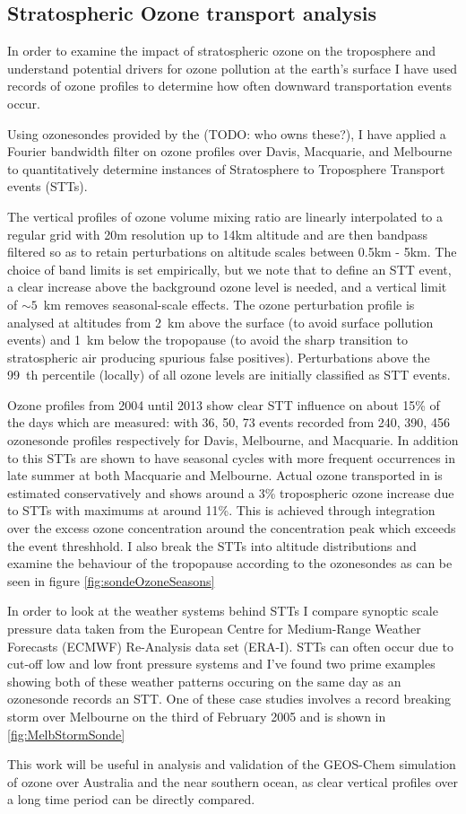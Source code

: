 \subsection{Stratospheric Ozone transport analysis}
In order to examine the impact of stratospheric ozone on the troposphere and understand potential drivers for ozone pollution at the earth's surface I have used records of ozone profiles to determine how often downward transportation events occur.

Using ozonesondes provided by the (TODO: who owns these?), I have applied a Fourier bandwidth filter on ozone profiles over Davis, Macquarie, and Melbourne to quantitatively determine instances of Stratosphere to Troposphere Transport events (STTs).

The vertical profiles of ozone volume mixing ratio are linearly interpolated to a regular grid with 20m resolution up to 14km altitude and are then bandpass filtered so as to retain perturbations on altitude scales between 0.5km - 5km. The choice of band limits is set empirically, but we note that to define an STT event, a clear increase above the background ozone level is needed, and a vertical limit of $\sim 5$~km removes seasonal-scale effects. 
The ozone perturbation profile is analysed at altitudes from 2~km above the surface (to avoid surface pollution events) and 1~km below the tropopause (to avoid the sharp transition to stratospheric air producing spurious false positives). Perturbations above the 99~th percentile (locally) of all ozone levels are initially classified as STT events.

Ozone profiles from 2004 until 2013 show clear STT influence on about 15\% of the days which are measured: with 36, 50, 73 events recorded from 240, 390, 456 ozonesonde profiles respectively for Davis, Melbourne, and Macquarie.
In addition to this STTs are shown to have seasonal cycles with more frequent occurrences in late summer at both Macquarie and Melbourne.
Actual ozone transported in is estimated conservatively and shows around a 3\% tropospheric ozone increase due to STTs with maximums at around 11\%.
This is achieved through integration over the excess ozone concentration around the concentration peak which exceeds the event threshhold. 
I also break the STTs into altitude distributions and examine the behaviour of the tropopause according to the ozonesondes as can be seen in figure \ref{fig:sondeOzoneSeasons}

In order to look at the weather systems behind STTs I compare synoptic scale pressure data taken from the European Centre for Medium-Range Weather Forecasts (ECMWF) Re-Analysis data set (ERA-I).
STTs can often occur due to cut-off low and low front pressure systems and I've found two prime examples showing both of these weather patterns occuring on the same day as an ozonesonde records an STT.
One of these case studies involves a record breaking storm over Melbourne on the third of February 2005 and is shown in \ref{fig:MelbStormSonde}

This work will be useful in analysis and validation of the GEOS-Chem simulation of ozone over Australia and the near southern ocean, as clear vertical profiles over a long time period can be directly compared.